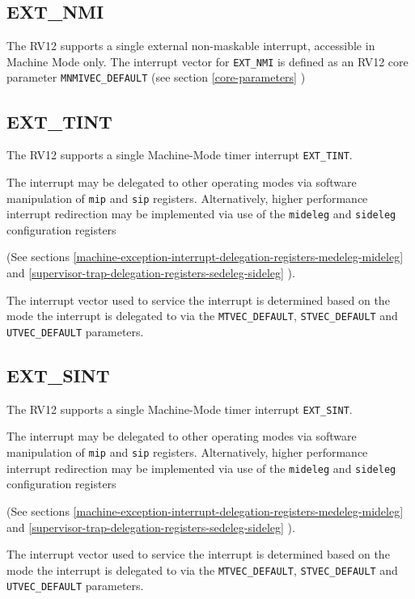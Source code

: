 \subsection{EXT\_NMI}\label{ext_nmi}

The RV12 supports a single external non-maskable interrupt, accessible in
Machine Mode only. The interrupt vector for \texttt{EXT\_NMI} is defined as an
RV12 core parameter \texttt{MNMIVEC\_DEFAULT} (see section \ref{core-parameters}
)

\subsection{EXT\_TINT}\label{ext_tint}

The RV12 supports a single Machine-Mode timer interrupt \texttt{EXT\_TINT}.

The interrupt may be delegated to other operating modes via software
manipulation of \texttt{mip} and \texttt{sip} registers. Alternatively, higher
performance interrupt redirection may be implemented via use of the
\texttt{mideleg} and \texttt{sideleg} configuration registers

\ifdefined\MARKDOWN
\else
(See sections \ref{machine-exception-interrupt-delegation-registers-medeleg-mideleg} and \ref{supervisor-trap-delegation-registers-sedeleg-sideleg} ).
\fi

The interrupt vector used to service the interrupt is determined based
on the mode the interrupt is delegated to via the \texttt{MTVEC\_DEFAULT},
\texttt{STVEC\_DEFAULT} and \texttt{UTVEC\_DEFAULT} parameters.

\subsection{EXT\_SINT}\label{ext_sint}

The RV12 supports a single Machine-Mode timer interrupt \texttt{EXT\_SINT}.

The interrupt may be delegated to other operating modes via software
manipulation of \texttt{mip} and \texttt{sip} registers.
Alternatively, higher performance interrupt redirection may be
implemented via use of the \texttt{mideleg} and \texttt{sideleg} configuration registers

\ifdefined\MARKDOWN
\else
(See sections \ref{machine-exception-interrupt-delegation-registers-medeleg-mideleg} and \ref{supervisor-trap-delegation-registers-sedeleg-sideleg} ).
\fi

The interrupt vector used to service the interrupt is determined based
on the mode the interrupt is delegated to via the \texttt{MTVEC\_DEFAULT},
\texttt{STVEC\_DEFAULT} and \texttt{UTVEC\_DEFAULT} parameters.

